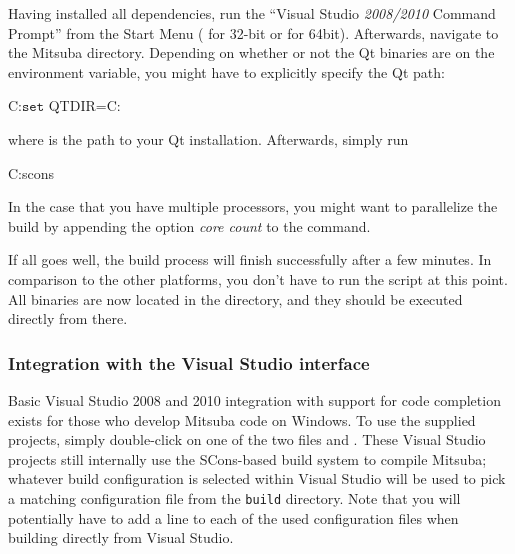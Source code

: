 Having installed all dependencies, run the ``Visual Studio \emph{2008/2010} Command 
Prompt'' from the Start Menu ( for 32-bit or  for 64bit). Afterwards,
navigate to the Mitsuba directory.
Depending on whether or not the Qt binaries are on the 
environment variable, you might have to explicitly specify the Qt path:
\begin{shell}
C:\Mitsuba\>$\texttt{set}$ QTDIR=C:\Qt
\end{shell}
where  is the path to your Qt installation.
Afterwards, simply run
\begin{shell}
C:\Mitsuba\>scons
\end{shell}
In the case that you have multiple processors, you might want to parallelize the build by appending the option \emph{core count} to the  command.

If all goes well, the build process will finish successfully after a few
minutes. In comparison to the other platforms, you don't have to run the  script at this point. 
All binaries are now located in the  directory, and they should be executed directly from there.

\subsubsection{Integration with the Visual Studio interface}
Basic Visual Studio 2008 and 2010 integration with support for code completion 
exists for those who develop Mitsuba code on Windows. 
To use the supplied projects, simply double-click on one of the two files  
and . These Visual Studio projects still internally
use the SCons-based build system to compile Mitsuba; whatever 
build configuration is selected within Visual Studio will be used to pick a matching
configuration file from the \texttt{build} directory. Note that you will
potentially have to add a  line to each of the
used configuration files when building directly from Visual Studio.

